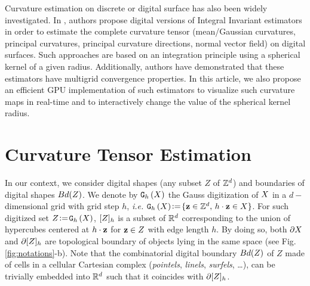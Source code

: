 \documentclass{llncs}
\begin{document}
Curvature estimation on discrete or digital surface has also been
widely investigated. In \cite{CVIU2014}, authors propose digital
versions of Integral Invariant estimators
\cite{Pottmann2007,Pottmann2009} in order to estimate the complete
curvature tensor (mean/Gaussian curvatures, principal curvatures,
principal curvature directions, normal vector field) on digital
surfaces. Such approaches are based on an integration principle using
a spherical kernel of a given radius. Additionally, authors have
demonstrated that these estimators have multigrid convergence
properties. In this article, we also propose an efficient GPU
implementation of such estimators to visualize%
such curvature maps in real-time and %
to interactively change the %
value of the spherical kernel radius.




\section{Curvature Tensor Estimation}
\label{sec:curv-tens-estim}

\sloppy In our context, we consider digital shapes (any subset $Z$ of ${\mathbb{Z}}^d$)
and boundaries of digital shapes $Bd(Z)$. We denote by $\mathtt{G}_{h}\left(X\right)$ the
Gauss digitization of $X$ in a $d-$dimensional grid with grid step $h$,
\emph{i.e.}  $\mathtt{G}_{h}\left(X\right) \!\mathrel{\mathop:}=\! \{ \mathbf{z} \in {\mathbb{Z}}^d,\, h\cdot\mathbf{z}\in X\}$. For such
digitized set $Z\!\mathrel{\mathop:}=\!\mathtt{G}_{h}\left(X\right)$, $\lbrack Z \rbrack_{h}$ is a subset of ${\mathbb{R}}^d$
corresponding to the union of hypercubes centered at $h\cdot \mathbf{z}$ for $\mathbf{z}\in Z$
with edge length $h$. By doing so, both $\partial X$ and
$\partial\lbrack Z \rbrack_{h}$ are topological boundary of objects lying in the same
space (see Fig. \ref{fig:notations}-b). Note that the combinatorial digital
boundary $Bd(Z)$ of $Z$ made of cells in a cellular Cartesian complex
(\emph{pointels}, \emph{linels}, \emph{surfels}, \ldots), can be trivially
embedded into ${\mathbb{R}}^d$ such that it coincides with $\partial\lbrack Z \rbrack_{h}$.
\end{document}
